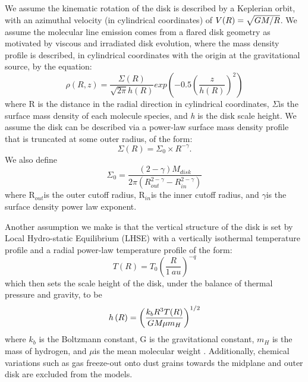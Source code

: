 \documentclass[twocolumn, 12pt]{aastex63}
\begin{document}

We assume the kinematic rotation of the disk is described by a Keplerian orbit, with an azimuthal velocity (in cylindrical coordinates) of $V(R) = \sqrt{GM_{\*}/R}$. We assume the molecular line emission comes from a flared disk geometry as motivated by viscous and irradiated disk evolution, where the mass density profile is described, in cylindrical coordinates with the origin at the gravitational source, by the equation:
\begin{equation}
\rho\left(R, z\right) = \frac{\Sigma(R)}{\sqrt{2\pi}h(R)}exp\left(-0.5\left(\frac{z}{h(R)}\right)^2\right)
\end{equation}
where R is the distance in the radial direction in cylindrical coordinates, $\Sigma$\space is the surface mass density of each molecule species,  and \textit{h} is the disk scale height. We assume the disk can be described via a power-law surface mass density profile that is truncated at some outer radius, of the form:
\begin{equation}
\Sigma\left(R\right) = \Sigma_{0}\times{R}^{-\gamma}.
\end{equation}
We also define
\begin{equation}
\Sigma_{0} = \frac{(2-\gamma)M_{disk}}{2\pi\left(R_{out}^{2-\gamma} - R_{in}^{2-\gamma}\right)}
\end{equation}
where R$_{out}$\space is the outer cutoff radius, R$_{in}$\space is the inner cutoff radius, and $\gamma$\space is the surface density power law exponent.

Another assumption we make is that the vertical structure of the disk is set by Local Hydro-static Equilibrium (LHSE) with a vertically isothermal temperature profile and a radial power-law temperature profile of the form:
\begin{equation}
T\left(R\right) = T_{0}\left(\frac{R}{1~au}\right)^{-q}
\end{equation}
which then sets the scale height of the disk, under the balance of thermal pressure and gravity, to be 
\begin{equation}
h\left(R\right) = \left(\frac{k_{b}R^{3}T(R)}{GM_{\*}\mu m_{H}}\right)^{1/2}
\end{equation}
where $k_{b}$ is the Boltzmann constant, G is the gravitational constant, $m_{H}$ is the mass of hydrogen, and $\mu$\space is the mean molecular weight \citep[assuming classic protostellar mean molecular weight, $\mu\approx2.37$; ][]{2003ApJ...591.1220L}. Additionally, chemical variations such as gas freeze-out onto dust grains towards the midplane and outer disk are excluded from the models.
\end{document}
